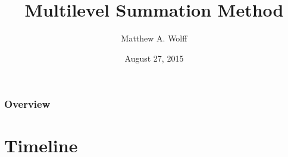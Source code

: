\documentclass{beamer}
\title[Multilevel Summation Method]{Multilevel Summation Method}
\author{Matthew A. Wolff} %
\institute[Purdue University] %
{
	Purdue University \\ %
	\medskip
	\textit{wolff1@purdue.edu} %
}
\date{August 27, 2015} %
\begin{document}
\begin{frame}
	\titlepage %
\end{frame}

\begin{frame}
	\frametitle{Overview} %
	\tableofcontents %
\end{frame}

\section{Timeline}
\end{document}
